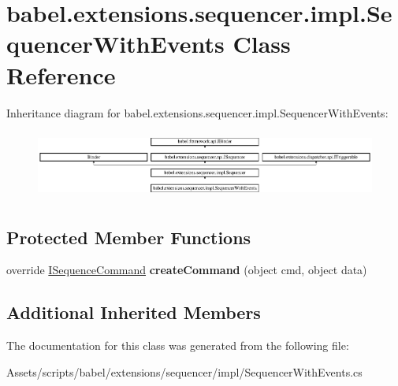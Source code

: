 \hypertarget{classbabel_1_1extensions_1_1sequencer_1_1impl_1_1_sequencer_with_events}{\section{babel.\-extensions.\-sequencer.\-impl.\-Sequencer\-With\-Events Class Reference}
\label{classbabel_1_1extensions_1_1sequencer_1_1impl_1_1_sequencer_with_events}
}
Inheritance diagram for babel.\-extensions.\-sequencer.\-impl.\-Sequencer\-With\-Events\-:\begin{figure}[H]
\begin{center}
\leavevmode
\includegraphics[height=2.262626cm]{classbabel_1_1extensions_1_1sequencer_1_1impl_1_1_sequencer_with_events}
\end{center}
\end{figure}
\subsection*{Protected Member Functions}
\begin{DoxyCompactItemize}
\item 
\hypertarget{classbabel_1_1extensions_1_1sequencer_1_1impl_1_1_sequencer_with_events_a3cab8f7055c01cd87238231d633db19b}{override \hyperlink{interfacebabel_1_1extensions_1_1sequencer_1_1api_1_1_i_sequence_command}{I\-Sequence\-Command} {\bfseries create\-Command} (object cmd, object data)}\label{classbabel_1_1extensions_1_1sequencer_1_1impl_1_1_sequencer_with_events_a3cab8f7055c01cd87238231d633db19b}

\end{DoxyCompactItemize}
\subsection*{Additional Inherited Members}


The documentation for this class was generated from the following file\-:\begin{DoxyCompactItemize}
\item 
Assets/scripts/babel/extensions/sequencer/impl/Sequencer\-With\-Events.\-cs\end{DoxyCompactItemize}
